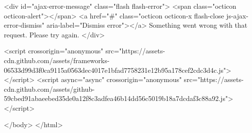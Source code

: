     
    

    <div id="ajax-error-message" class="flash flash-error">
      <span class="octicon octicon-alert"></span>
      <a href="#" class="octicon octicon-x flash-close js-ajax-error-dismiss" aria-label="Dismiss error"></a>
      Something went wrong with that request. Please try again.
    </div>


      <script crossorigin="anonymous" src="https://assets-cdn.github.com/assets/frameworks-06533d99d3f0ca9115a0563dec4017e1bfad7758231e12b95a178cef2cdc3d4c.js"></script>
      <script async="async" crossorigin="anonymous" src="https://assets-cdn.github.com/assets/github-59cbed91abaeebed35de0a12f8c3adfea46b14dd56c5019b18a7dcdaf3c88a92.js"></script>
      
      

  </body>
</html>

